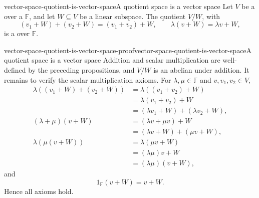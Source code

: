 \documentclass[preview]{standalone}
\begin{document}
\begin{snippetproposition}{vector-space-quotient-is-vector-space}{A quotient space is a vector space}
    Let \(V\) be a \vectorspace over a \field \(\mathbb{F}\), and let
    \(W\subseteq V\) be a linear subspace. The quotient \(V/W\), with
    \[
        (v_1+W)+(v_2+W)=(v_1+v_2)+W,
        \qquad
        \lambda(v+W)=\lambda v+W,
    \]
    is a \vectorspace over \(\mathbb{F}\).
\end{snippetproposition}

\begin{snippetproof}{vector-space-quotient-is-vector-space-proof}{vector-space-quotient-is-vector-space}{A quotient space is a vector space}
    Addition and scalar multiplication are well-defined by the preceding
    propositions, and \(V/W\) is an abelian \group under addition. It remains
    to verify the scalar multiplication axioms. For
    \(\lambda,\mu\in\mathbb{F}\) and \(v,v_1,v_2\in V\),
    \begin{align*}
        \lambda((v_1+W)+(v_2+W))
        &=\lambda((v_1+v_2)+W) \\
        &=\lambda(v_1+v_2)+W \\
        &=(\lambda v_1+W)+(\lambda v_2+W), \\
        (\lambda+\mu)(v+W)
        &=(\lambda v+\mu v)+W \\
        &=(\lambda v+W)+(\mu v+W), \\
        \lambda(\mu(v+W))
        &=\lambda(\mu v+W) \\
        &=(\lambda\mu)v+W \\
        &=(\lambda\mu)(v+W),
    \end{align*}
    and
    \[
        1_{\mathbb{F}}(v+W)=v+W.
    \]
    Hence all \vectorspace axioms hold.
\end{snippetproof}
\end{document}
